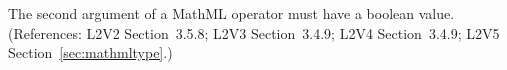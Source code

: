The second argument of a MathML  operator must have
a boolean value.  (References: L2V2 Section~3.5.8; L2V3 Section~3.4.9; L2V4 Section~3.4.9;
L2V5 Section~\ref{sec:mathmltype}.)
